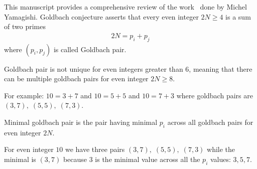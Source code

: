 This manuscript provides a comprehensive review of the work~\cite{yamagishi2025goldbach} done by Michel Yamagishi.
Goldbach conjecture asserts that every even integer $2N \geq 4$ is a sum of two primes
\begin{align*}
    2N = p_i + p_j
\end{align*}
where $(p_i, p_j)$ is called Goldbach pair.

Goldbach pair is not unique for even integers greater than 6,
meaning that there can be multiple goldbach pairs for even integer $2N \geq 8$.

For example: $10=3+7$ and $10=5+5$ and $10=7+3$ where goldbach pairs are $(3,7), \; (5,5), \; (7,3)$.

Minimal goldbach pair is the pair having minimal $p_i$ across all goldbach pairs for even integer $2N$.

For even integer $10$ we have three pairs $(3,7), \; (5,5), \; (7,3)$ while the minimal is $(3,7)$ because
$3$ is the minimal value across all the $p_i$ values: $3, 5, 7$.

